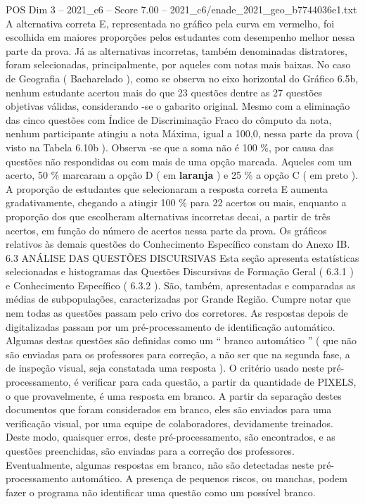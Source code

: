 \begin{textsample}{POS Dim 3 – 2021\_c6 – Score 7.00 – 2021\_c6/enade\_2021\_geo\_b7744036e1.txt}
A alternativa correta E, representada no gráfico pela curva em vermelho, foi escolhida em maiores proporções pelos estudantes com desempenho melhor nessa parte da prova.
Já as alternativas incorretas, também denominadas distratores, foram selecionadas, principalmente, por aqueles com notas mais baixas.
No caso de Geografia ( Bacharelado ), como se observa no eixo horizontal do Gráfico 6.5b, nenhum estudante acertou mais do que 23 questões dentre as 27 questões objetivas válidas, considerando -se o gabarito original.
Mesmo com a eliminação das cinco questões com Índice de Discriminação Fraco do cômputo da nota, nenhum participante atingiu a nota Máxima, igual a 100,0, nessa parte da prova ( visto na Tabela 6.10b ).
Observa -se que a soma não é 100 \%, por causa das questões não respondidas ou com mais de uma opção marcada.
Aqueles com um acerto, 50 \% marcaram a opção D ( em \textbf{laranja} ) e 25 \% a opção C ( em preto ).
A proporção de estudantes que selecionaram a resposta correta E aumenta gradativamente, chegando a atingir 100 \% para 22 acertos ou mais, enquanto a proporção dos que escolheram alternativas incorretas decai, a partir de três acertos, em função do número de acertos nessa parte da prova.
Os gráficos relativos às demais questões do Conhecimento Específico constam do Anexo IB. 6.3 ANÁLISE DAS QUESTÕES DISCURSIVAS Esta seção apresenta estatísticas selecionadas e histogramas das Questões Discursivas de Formação Geral ( 6.3.1 ) e Conhecimento Específico ( 6.3.2 ).
São, também, apresentadas e comparadas as médias de subpopulações, caracterizadas por Grande Região.
Cumpre notar que nem todas as questões passam pelo crivo dos corretores.
As respostas depois de digitalizadas passam por um pré-processamento de identificação automático.
Algumas destas questões são definidas como um “ branco automático ” ( que não são enviadas para os professores para correção, a não ser que na segunda fase, a de inspeção visual, seja constatada uma resposta ).
O critério usado neste pré-processamento, é verificar para cada questão, a partir da quantidade de PIXELS, o que provavelmente, é uma resposta em branco.
A partir da separação destes documentos que foram considerados em branco, eles são enviados para uma verificação visual, por uma equipe de colaboradores, devidamente treinados.
Deste modo, quaisquer erros, deste pré-processamento, são encontrados, e as questões preenchidas, são enviadas para a correção dos professores.
Eventualmente, algumas respostas em branco, não são detectadas neste pré-processamento automático.
A presença de pequenos riscos, ou manchas, podem fazer o programa não identificar uma questão como um possível branco.

\end{textsample}
